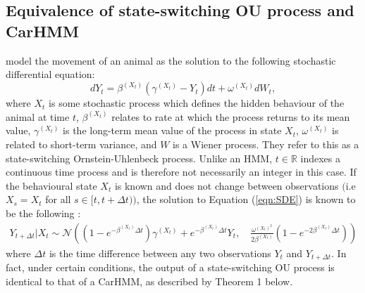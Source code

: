 
\subsection{Equivalence of state-switching OU process and CarHMM}

\citet{Michelot:2019} model the movement of an animal as the solution to the following stochastic differential equation:
%
\begin{equation}
    \label{eqn:SDE}
    dY_t = \beta^{(X_t)}(\gamma^{(X_t)} - Y_t)dt + \omega^{(X_t)} dW_t,
\end{equation}
%
where $X_t$ is some stochastic process which defines the hidden behaviour of the animal at time $t$, $\beta^{(X_t)}$ relates to rate at which the process returns to its mean value, $\gamma^{(X_t)}$ is the long-term mean value of the process in state $X_t$, $\omega^{(X_t)}$ is related to short-term variance, and $W$ is a Wiener process. They refer to this as a state-switching Ornstein-Uhlenbeck process. Unlike an HMM, $t \in \mathbb{R}$ indexes a continuous time process and is therefore not necessarily an integer in this case. If the behavioural state $X_t$ is known and does not change between observations $\Big($i.e $X_s = X_t$ for all $s \in [t,t+\Delta t)\Big)$, the solution to Equation (\ref{eqn:SDE}) is known to be the following \citep{Michelot:2019}:
%
\begin{align}
    Y_{t+\Delta t} | X_{t} \sim \mathcal{N}\left((1-e^{-\beta^{(X_t)}\Delta t})\gamma^{(X_t)} + e^{-\beta^{(X_t)}\Delta t} Y_t,\quad \frac{\omega^{(X_t)^2}}{2\beta^{(X_t)}} (1-e^{-2\beta^{(X_t)}\Delta t})\right)
    \label{eqn:OU_sol}
\end{align}
%
where $\Delta t$ is the time difference between any two observations $Y_t$ and $Y_{t+\Delta t}$. In fact, under certain conditions, the output of a state-switching OU process is identical to that of a CarHMM, as described by Theorem 1 below.

